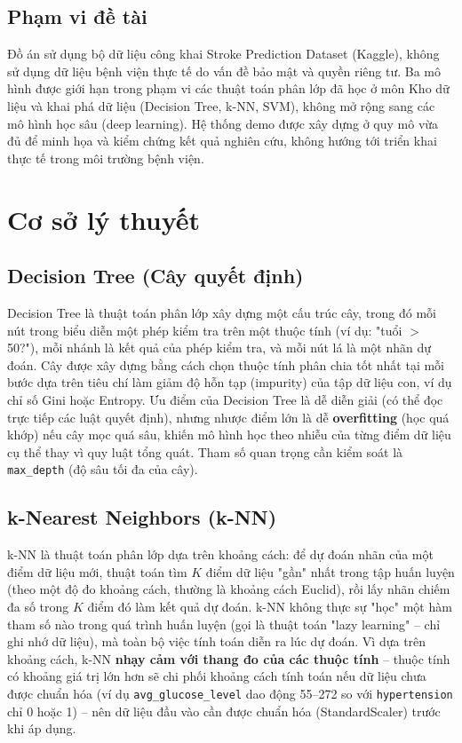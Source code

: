 \documentclass[12pt,a4paper]{report}
\begin{document}
\section{Phạm vi đề tài}

Đồ án sử dụng bộ dữ liệu công khai Stroke Prediction Dataset (Kaggle), không sử dụng dữ liệu bệnh viện thực tế do vấn đề bảo mật và quyền riêng tư. Ba mô hình được giới hạn trong phạm vi các thuật toán phân lớp đã học ở môn Kho dữ liệu và khai phá dữ liệu (Decision Tree, k-NN, SVM), không mở rộng sang các mô hình học sâu (deep learning). Hệ thống demo được xây dựng ở quy mô vừa đủ để minh họa và kiểm chứng kết quả nghiên cứu, không hướng tới triển khai thực tế trong môi trường bệnh viện.

\chapter{Cơ sở lý thuyết}

\section{Decision Tree (Cây quyết định)}

Decision Tree là thuật toán phân lớp xây dựng một cấu trúc cây, trong đó mỗi nút trong biểu diễn một phép kiểm tra trên một thuộc tính (ví dụ: "tuổi $>$ 50?"), mỗi nhánh là kết quả của phép kiểm tra, và mỗi nút lá là một nhãn dự đoán. Cây được xây dựng bằng cách chọn thuộc tính phân chia tốt nhất tại mỗi bước dựa trên tiêu chí làm giảm độ hỗn tạp (impurity) của tập dữ liệu con, ví dụ chỉ số Gini hoặc Entropy. Ưu điểm của Decision Tree là dễ diễn giải (có thể đọc trực tiếp các luật quyết định), nhưng nhược điểm lớn là dễ \textbf{overfitting} (học quá khớp) nếu cây mọc quá sâu, khiến mô hình học theo nhiễu của từng điểm dữ liệu cụ thể thay vì quy luật tổng quát. Tham số quan trọng cần kiểm soát là \texttt{max\_depth} (độ sâu tối đa của cây).

\section{k-Nearest Neighbors (k-NN)}

k-NN là thuật toán phân lớp dựa trên khoảng cách: để dự đoán nhãn của một điểm dữ liệu mới, thuật toán tìm $K$ điểm dữ liệu "gần" nhất trong tập huấn luyện (theo một độ đo khoảng cách, thường là khoảng cách Euclid), rồi lấy nhãn chiếm đa số trong $K$ điểm đó làm kết quả dự đoán. k-NN không thực sự "học" một hàm tham số nào trong quá trình huấn luyện (gọi là thuật toán "lazy learning" -- chỉ ghi nhớ dữ liệu), mà toàn bộ việc tính toán diễn ra lúc dự đoán. Vì dựa trên khoảng cách, k-NN \textbf{nhạy cảm với thang đo của các thuộc tính} -- thuộc tính có khoảng giá trị lớn hơn sẽ chi phối khoảng cách tính toán nếu dữ liệu chưa được chuẩn hóa (ví dụ \texttt{avg\_glucose\_level} dao động 55--272 so với \texttt{hypertension} chỉ 0 hoặc 1) -- nên dữ liệu đầu vào cần được chuẩn hóa (StandardScaler) trước khi áp dụng.
\end{document}
